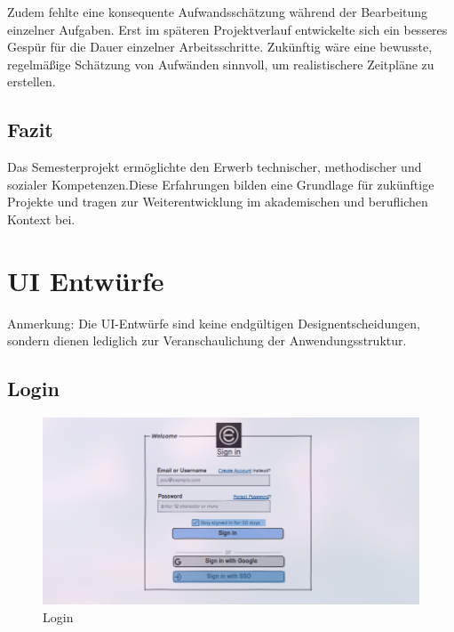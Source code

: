 \documentclass[a4paper,12pt]{article}
\begin{document}
Zudem fehlte eine konsequente Aufwandsschätzung während der Bearbeitung einzelner Aufgaben. Erst im späteren Projektverlauf entwickelte sich ein besseres Gespür für die Dauer einzelner Arbeitsschritte. Zukünftig wäre eine bewusste, regelmäßige Schätzung von Aufwänden sinnvoll, um realistischere Zeitpläne zu erstellen.


\subsection{Fazit}

Das Semesterprojekt ermöglichte den Erwerb technischer, methodischer und sozialer Kompetenzen.Diese Erfahrungen bilden eine Grundlage für zukünftige Projekte und tragen zur Weiterentwicklung im akademischen und beruflichen Kontext bei.

\newpage

\appendix


\section{UI Entwürfe}
Anmerkung: Die UI-Entwürfe sind keine endgültigen Designentscheidungen, sondern dienen lediglich zur Veranschaulichung der Anwendungsstruktur.

\subsection{Login}
\begin{figure}[H]
    \centering
    \includegraphics[width=1\textwidth]{Abbildungen/events/login.png}
    \caption{Login}
    \label{fig:login}
\end{figure}
\end{document}
